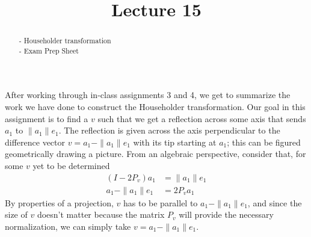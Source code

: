 \documentclass{ximera}
\begin{document}
    \title{Lecture 15}
    
    \begin{abstract} 
        - Householder transformation \\
        - Exam Prep Sheet
    \end{abstract}
    \maketitle

After working through in-class assignments 3 and 4, we get to summarize the work we have done to construct the Householder transformation.  Our goal in this assignment is to find a $v$ such that we get a reflection across some axis that sends $a_1$ to $\|a_1\|e_1$.  The reflection is given across the axis perpendicular to the difference vector $v= a_1- \|a_1\| e_1$ with its tip starting at $a_1$; this can be figured geometrically drawing a picture.  From an algebraic perspective, consider that, for some $v$ yet to be determined
\begin{align*}
    (I-2P_v)a_1 &= \|a_1\|e_1 \\
    a_1 - \|a_1\|e_1 &= 2P_v a_1
\end{align*}
By properties of a projection, $v$ has to be parallel to $a_1 - \|a_1\|e_1$, and since the size of $v$ doesn't matter because the matrix $P_v$ will provide the necessary normalization, we can simply take $v = a_1 - \|a_1\|e_1$.
\end{document}
